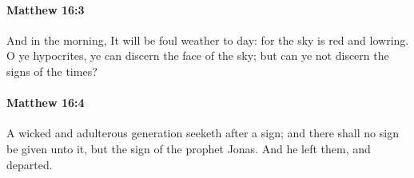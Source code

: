 		\paragraph{Matthew 16:3} %
			\label{MATTHEW-16-3}

			And in the morning, It will be foul weather to day: for the sky is red and lowring. O ye hypocrites, ye can discern the face of the sky; but can ye not discern the signs of the times?

			\begin{framed}
			\scriptsize
				\begin{compactdesc}
					\item[SBLG] 
				\end{compactdesc}
			\end{framed}

		\paragraph{Matthew 16:4} %
			\label{MATTHEW-16-4}

			A wicked and adulterous generation seeketh after a sign; and there shall no sign be given unto it, but the sign of the prophet Jonas. And he left them, and departed.

